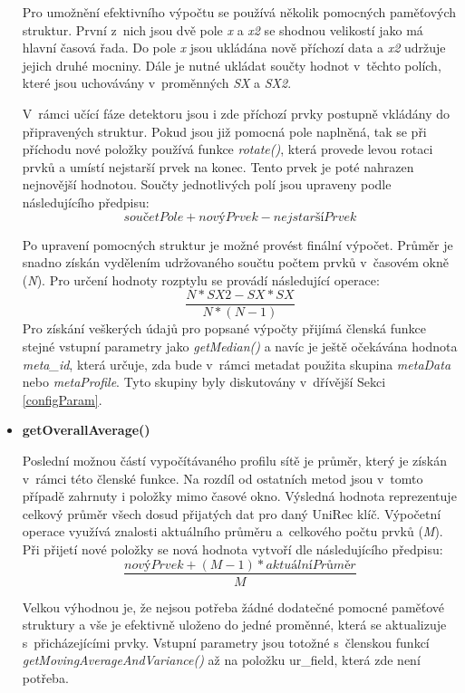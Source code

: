 \begin{itemize}
 Pro umožnění efektivního výpočtu se používá několik pomocných paměťových struktur. První z~nich 
 jsou dvě pole \textit{x} a \textit{x2} se shodnou velikostí jako má hlavní časová řada. Do pole
 \textit{x} jsou ukládána
 nově příchozí data a \textit{x2} udržuje jejich druhé mocniny. Dále je nutné ukládat součty
 hodnot v~těchto polích, které jsou uchovávány v~proměnných \textit{SX} a \textit{SX2}.
 
 V~rámci učící fáze detektoru jsou i zde příchozí prvky postupně vkládány do připravených struktur.
 Pokud jsou již pomocná pole naplněná, tak se při příchodu nové položky používá funkce
 \textit{rotate()}, která provede levou rotaci prvků a umístí nejstarší prvek na konec. Tento
 prvek je poté nahrazen nejnovější hodnotou. Součty jednotlivých polí jsou upraveny podle 
 následujícího předpisu:  
 \[
  součetPole + novýPrvek - nejstaršíPrvek
\]
 
 Po upravení pomocných struktur je možné provést finální výpočet. Průměr je snadno získán vydělením
 udržovaného součtu počtem prvků v~časovém okně (\textit{N}). Pro určení hodnoty rozptylu se provádí
 následující operace:
\[
   \frac{N * SX2 - SX * SX}{N * (N - 1)}
\]
Pro získání veškerých údajů pro popsané výpočty přijímá členská funkce stejné vstupní parametry
jako \textit{getMedian()} a navíc je ještě očekávána hodnota \textit{meta\_id}, která určuje, 
zda bude v~rámci metadat použita skupina \textit{metaData} nebo \textit{metaProfile}.
Tyto skupiny byly diskutovány v~dřívější Sekci \ref{configParam}.


 \item \textbf{getOverallAverage()}%
 
 Poslední možnou částí vypočítávaného profilu sítě je průměr, který je získán v~rámci 
 této členské funkce. Na rozdíl od ostatních metod jsou v~tomto případě zahrnuty i položky 
 mimo časové okno. Výsledná hodnota reprezentuje celkový průměr všech dosud přijatých dat pro 
 daný UniRec klíč. Výpočetní operace využívá znalosti aktuálního průměru a~celkového počtu prvků
 (\textit{M}). Při přijetí 
 nové položky se nová hodnota vytvoří dle následujícího předpisu:
 \[
 \frac{novýPrvek + (M - 1) * aktuálníPrůměr}{M} 
 \]

 Velkou výhodnou je, že nejsou potřeba žádné dodatečné pomocné paměťové struktury a vše je 
 efektivně uloženo do jedné proměnné, která se aktualizuje s~přicházejícími prvky. Vstupní
 parametry jsou totožné s~členskou funkcí \textit{getMovingAverageAndVariance()} až na položku
 {ur\_field}, která zde není potřeba.
\end{itemize}


